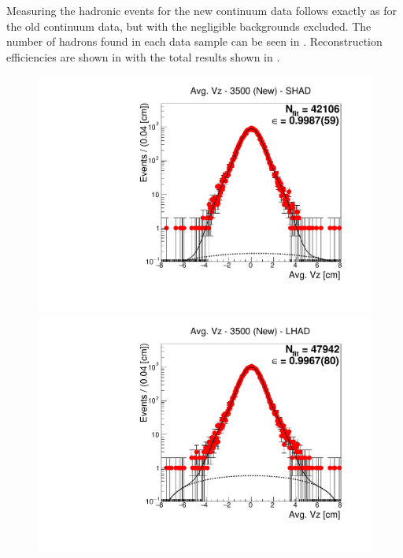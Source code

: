 Measuring the hadronic events for the new continuum data follows exactly as for the old continuum data, but with the negligible backgrounds excluded.
The number of hadrons found in each data sample can be seen in .
Reconstruction efficiencies are shown in  with the total results shown in .

\begin{figure}[H]
\centering
\includegraphics[scale=0.25]{figures/plots/nonDDbar_fit_results/3650_new/fit_new_3500_data_SHAD.pdf}
\hspace{-0.5cm}
\includegraphics[scale=0.25]{figures/plots/nonDDbar_fit_results/3650_new/fit_new_3500_data_LHAD.pdf}

\end{figure}
